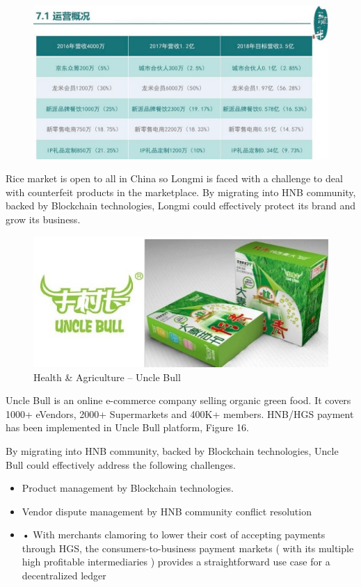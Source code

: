 \documentclass[fleqn,10pt]{SelfArx} %
\begin{document}
\begin{figure}[ht]\centering
\includegraphics[width=\linewidth]{15}
\caption{}
\label{fig:15}
\end{figure}

Rice market is open to all in China so Longmi is faced with a challenge to deal with counterfeit products in the marketplace.  By migrating into HNB community, backed by Blockchain technologies, Longmi could effectively protect its brand and grow its business. \\


\begin{figure}[ht]\centering
\includegraphics[width=\linewidth]{16}
\caption{Health \& Agriculture – Uncle Bull}
\label{fig:16}
\end{figure}


Uncle Bull is an online e-commerce company selling organic green food. It covers 1000+ eVendors, 2000+ Supermarkets and 400K+ members. HNB/HGS payment has been implemented in Uncle Bull platform, Figure 16.

By migrating into HNB community, backed by Blockchain technologies, Uncle Bull could effectively address the following challenges.
\begin{itemize}
\item{Product management by Blockchain technologies. }
\item{Vendor dispute management by HNB community conflict resolution}
\item{•	With merchants clamoring to lower their cost of accepting payments through HGS, the consumers-to-business payment markets ( with its multiple high profitable intermediaries ) provides a straightforward use case for a decentralized ledger}
\end{itemize}
\end{document}
